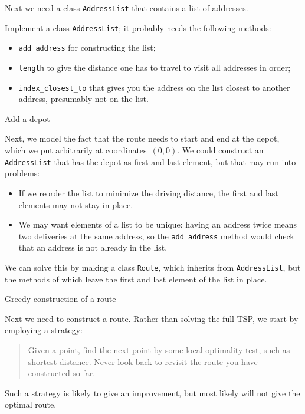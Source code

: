Next we need a class \lstinline{AddressList} that contains a list of
addresses.

\begin{exercise}
  Implement a class \lstinline{AddressList}; it probably needs the
  following methods:
  \begin{itemize}
  \item \lstinline{add_address} for constructing the list;
  \item \lstinline{length} to give the distance one has to travel to
    visit all addresses in order;
  \item \lstinline{index_closest_to} that gives you the address on the
    list closest to another address, presumably not on the list.
  \end{itemize}
\end{exercise}

 {Add a depot}

Next, we model the fact that the route
needs to start and end at the depot, which we put arbitrarily at
coordinates~$(0,0)$. We could construct an \lstinline{AddressList}
that has the depot as first and last element, but that may run into
problems:
\begin{itemize}
\item If we reorder the list to minimize the driving distance, the
  first and last elements may not stay in place.
\item We may want elements of a list to be unique: having an address
  twice means two deliveries at the same address, so the
  \lstinline{add_address} method would check that an address is not
  already in the list.
\end{itemize}
We can solve this by making a class \lstinline{Route}, which inherits
from \lstinline{AddressList}, but the methods of which leave the first
and last element of the list in place.

 {Greedy construction of a route}

%
Next we need to construct a route. Rather than solving the full
\ac{TSP}, we start by employing a  strategy:
\begin{quote}
  Given a point, find the next point by some local optimality test,
  such as shortest distance. Never look back to revisit the route you
  have constructed so far.
\end{quote}
Such a strategy is likely to give an improvement, but most likely will
not give the optimal route.

